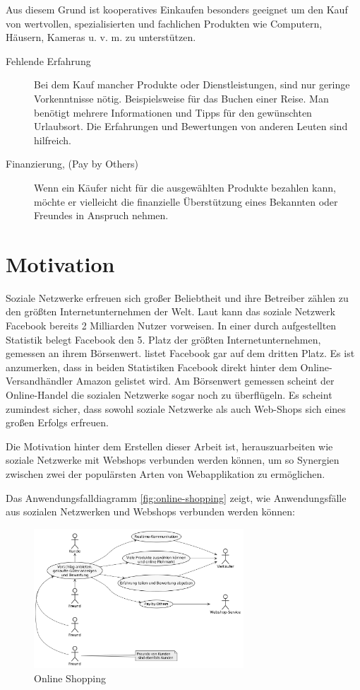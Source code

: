 Aus diesem Grund ist kooperatives Einkaufen besonders geeignet um den Kauf von wertvollen, spezialisierten und fachlichen Produkten wie Computern, Häusern, Kameras u. v. m. zu unterstützen.

\begin{description}
\item[Fehlende Erfahrung] Bei dem Kauf mancher Produkte oder Dienstleistungen, sind nur geringe Vorkenntnisse nötig. Beispielsweise für das Buchen einer Reise. Man benötigt mehrere Informationen und Tipps für den gewünschten Urlaubsort. Die Erfahrungen und Bewertungen von anderen Leuten sind hilfreich.
\item[Finanzierung, (Pay by Others)] Wenn ein Käufer nicht für die ausgewählten Produkte bezahlen kann, möchte er vielleicht die finanzielle Überstützung eines Bekannten oder Freundes in Anspruch nehmen.
\end{description}


\section{Motivation}

Soziale Netzwerke erfreuen sich großer Beliebtheit und ihre Betreiber zählen zu den größten Internetunternehmen der Welt. Laut \textcite{sokolov:facebook} kann das soziale Netzwerk Facebook bereits 2 Milliarden Nutzer vorweisen. In einer durch \textcite{nasdaq} aufgestellten Statistik belegt Facebook den 5. Platz der größten Internetunternehmen, gemessen an ihrem Börsenwert. \textcite{mittermeier} listet Facebook gar auf dem dritten Platz. Es ist anzumerken, dass in beiden Statistiken Facebook direkt hinter dem Online-Versandhändler Amazon gelistet wird. Am Börsenwert gemessen scheint der Online-Handel die sozialen Netzwerke sogar noch zu überflügeln. Es scheint zumindest sicher, dass sowohl soziale Netzwerke als auch Web-Shops sich eines großen Erfolgs erfreuen.

Die Motivation hinter dem Erstellen dieser Arbeit ist, herauszuarbeiten wie soziale Netzwerke mit Webshops verbunden werden können, um so Synergien zwischen zwei der populärsten Arten von Webapplikation zu ermöglichen.

Das Anwendungsfalldiagramm \vref{fig:online-shopping} zeigt, wie Anwendungsfälle aus sozialen Netzwerken und Webshops verbunden werden können:

\begin{figure}[htbp]
	\centering
	\includegraphics[width=0.7\textwidth]{uml-diagramme/online-shopping.png}
	\caption{Online Shopping}
	\label{fig:online-shopping}
\end{figure}


